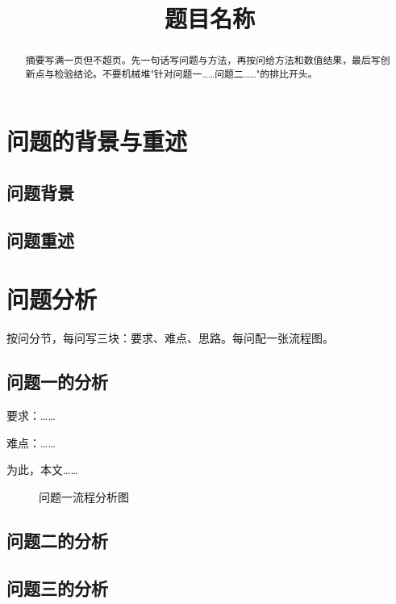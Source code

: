 \documentclass[withoutpreface,bwprint]{cumcmthesis}
\title{题目名称}
\begin{document}
\maketitle

\begin{abstract}
摘要写满一页但不超页。先一句话写问题与方法，再按问给方法和数值结果，最后写创新点与检验结论。不要机械堆"针对问题一……问题二……"的排比开头。

\end{abstract}

\tableofcontents
\newpage

\section{问题的背景与重述}

\subsection{问题背景}

\subsection{问题重述}

\section{问题分析}

按问分节，每问写三块：要求、难点、思路。每问配一张流程图。

\subsection{问题一的分析}

要求：……

难点：……

为此，本文……

\begin{figure}[H]
\centering
\caption{问题一流程分析图}
\end{figure}

\subsection{问题二的分析}

\subsection{问题三的分析}
\end{document}
